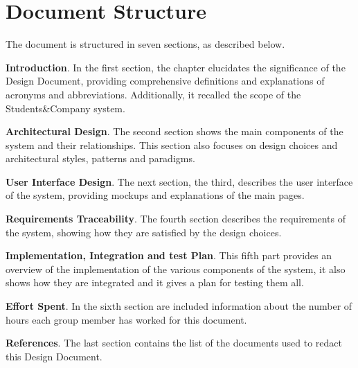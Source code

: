\section{Document Structure}
\label{sec:doc_structure}%
The document is structured in seven sections, as described below.

\textbf{Introduction}. In the first section, the chapter elucidates the significance of the Design 
Document, providing comprehensive definitions and explanations of acronyms and abbreviations. Additionally, it recalled the scope of the Students\&Company system.

\textbf{Architectural Design}. The second section shows the main components of the system and their relationships. This section also focuses on design choices and architectural styles, patterns and paradigms.

\textbf{User Interface Design}. The next section, the third, describes the user interface of the system, providing mockups and explanations of the main pages.

\textbf{Requirements Traceability}. The fourth section describes the requirements of the system, showing how they are satisfied by the design choices.

\textbf{Implementation, Integration and test Plan}. This fifth part provides an overview of the implementation of the various components of the system, it also shows how they are integrated and it gives a plan for testing them all.

\textbf{Effort Spent}. In the sixth section are included information about the number of hours each group member has worked for this document.

\textbf{References}. The last section contains the list of the documents used to redact this Design Document.
 
